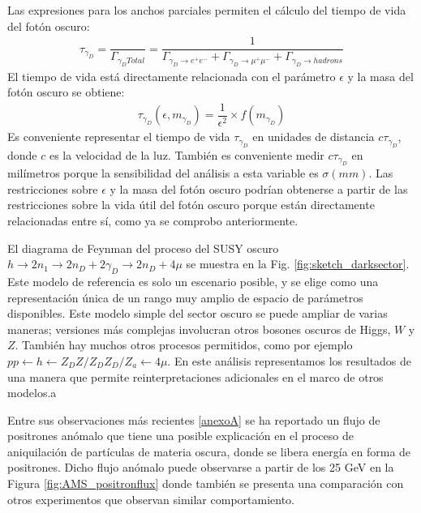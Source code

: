 Las expresiones para los anchos parciales permiten el cálculo del tiempo de vida del fotón oscuro:
\begin{eqnarray}
\label{an-15-455:ec6}
\tau_{\gamma_D} = \dfrac{}{\Gamma_{\gamma_D Total}} =\dfrac{1}{\Gamma_{\gamma_D \rightarrow e^+ e^-} + \Gamma_{\gamma_D \rightarrow \mu^+ \mu^-} + \Gamma_{\gamma_D \rightarrow hadrons }}
\end{eqnarray}
El tiempo de vida está directamente relacionada con el parámetro $\epsilon$ y la masa del fotón oscuro se obtiene:
\begin{eqnarray}
\label{an-15-455:ec7}
\tau_{\gamma_D}(\epsilon,m_{\gamma_D}) =\dfrac{1}{\epsilon^2}\times f(m_{\gamma_D})
\end{eqnarray}
Es conveniente representar el tiempo de vida $\tau_{\gamma_D}$ en unidades de distancia $c\tau_{\gamma_D}$, donde $c$ es la velocidad de la luz. También es conveniente medir $c\tau_{\gamma_D}$ en milímetros porque la sensibilidad del análisis a esta variable es $\sigma(mm)$. Las restricciones sobre $\epsilon$ y la masa del fotón oscuro podrían obtenerse a partir de las restricciones sobre la vida útil del fotón oscuro porque están directamente relacionadas entre sí, como ya se comprobo anteriormente.

El diagrama de Feynman del proceso del SUSY oscuro  $h \rightarrow 2n_1 \rightarrow 2n_D + 2\gamma_D \rightarrow 2n_D + 4\mu$ se muestra en la Fig. \ref{fig:sketch_darksector}. Este modelo de referencia es solo un escenario posible, y se elige como una representación única de un rango muy amplio de espacio de parámetros disponibles. Este modelo simple del sector oscuro se puede ampliar de varias maneras; versiones más complejas involucran otros bosones oscuros de Higgs, $W$ y $Z$. También hay muchos otros procesos permitidos, como por ejemplo $pp \leftarrow h \leftarrow Z_D Z / Z_D Z_D / Z_a \leftarrow 4\mu$. En este análisis representamos los resultados de una manera que permite reinterpretaciones adicionales en el marco de otros modelos.a





Entre sus observaciones más recientes \ref{anexoA} se ha reportado un flujo de positrones anómalo que tiene una posible explicación en el proceso de aniquilación de partículas de materia oscura, donde se libera energía en forma de positrones. Dicho flujo anómalo puede observarse
a partir de los 25 GeV en la Figura \ref{fig:AMS_positronflux} donde también se presenta una comparación con otros experimentos que observan similar comportamiento.

